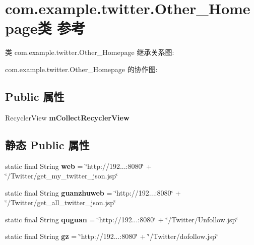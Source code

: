 \hypertarget{classcom_1_1example_1_1twitter_1_1_other___homepage}{}\section{com.\+example.\+twitter.\+Other\+\_\+\+Homepage类 参考}
\label{classcom_1_1example_1_1twitter_1_1_other___homepage}


类 com.\+example.\+twitter.\+Other\+\_\+\+Homepage 继承关系图\+:


com.\+example.\+twitter.\+Other\+\_\+\+Homepage 的协作图\+:
\subsection*{Public 属性}
\begin{DoxyCompactItemize}
\item 
\mbox{\label{classcom_1_1example_1_1twitter_1_1_other___homepage_adca2a2b372a9e60a059fc9963187d958}} 
Recycler\+View {\bfseries m\+Collect\+Recycler\+View}
\end{DoxyCompactItemize}
\subsection*{静态 Public 属性}
\begin{DoxyCompactItemize}
\item 
\mbox{\label{classcom_1_1example_1_1twitter_1_1_other___homepage_ad70c76804cfd473569e94a84ac3848ca}} 
static final String {\bfseries web} = \char`\"{}http\+://192...\+:8080\char`\"{} + \char`\"{}/Twitter/get\+\_\+my\+\_\+twitter\+\_\+json.\+jsp\char`\"{}
\item 
\mbox{\label{classcom_1_1example_1_1twitter_1_1_other___homepage_aba79dececf97dcbd3a726443bcc14c07}} 
static final String {\bfseries guanzhuweb} = \char`\"{}http\+://192...\+:8080\char`\"{} + \char`\"{}/Twitter/get\+\_\+all\+\_\+twitter\+\_\+json.\+jsp\char`\"{}
\item 
\mbox{\label{classcom_1_1example_1_1twitter_1_1_other___homepage_aed297e1d9fb5a06f7059b5813f7810b4}} 
static final String {\bfseries quguan} = \char`\"{}http\+://192...\+:8080\char`\"{} + \char`\"{}/Twitter/Unfollow.\+jsp\char`\"{}
\item 
\mbox{\label{classcom_1_1example_1_1twitter_1_1_other___homepage_a37cfa5b96e612c047170f2a0d6cebd3b}} 
static final String {\bfseries gz} = \char`\"{}http\+://192...\+:8080\char`\"{} + \char`\"{}/Twitter/dofollow.\+jsp\char`\"{}
\end{DoxyCompactItemize}
